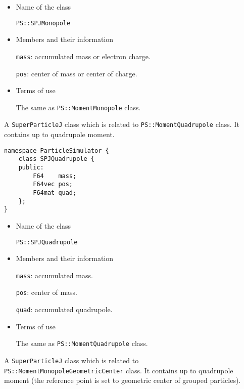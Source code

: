 \begin{itemize}

\item Name of the class

  \texttt{PS::SPJMonopole}


\item Members and their information

  \texttt{mass}: accumulated mass or electron charge.

  \texttt{pos}: center of mass or center of charge.

\item Terms of use

  The same as \texttt{PS::MomentMonopole} class.

\end{itemize}

\label{sec:SPJQuadrupole}

A \texttt{SuperParticleJ} class which is related to \texttt{PS::MomentQuadrupole} class. It contains up to quadrupole moment.

\begin{screen}
\begin{verbatim}
namespace ParticleSimulator {
    class SPJQuadrupole {
    public:
        F64    mass;
        F64vec pos;
        F64mat quad;
    };
}
\end{verbatim}
\end{screen}

\begin{itemize}

\item Name of the class

  \texttt{PS::SPJQuadrupole}

\item Members and their information

  \texttt{mass}: accumulated mass.

  \texttt{pos}: center of mass.

  \texttt{quad}: accumulated quadrupole.

\item Terms of use

  The same as \texttt{PS::MomentQuadrupole} class.

\end{itemize}

\label{sec:SPJMonopoleGeometricCenter}

A \texttt{SuperParticleJ} class which is related to \texttt{PS::MomentMonopoleGeometricCenter} class. It contains up to quadrupole moment (the reference point is set to geometric center of grouped particles).

